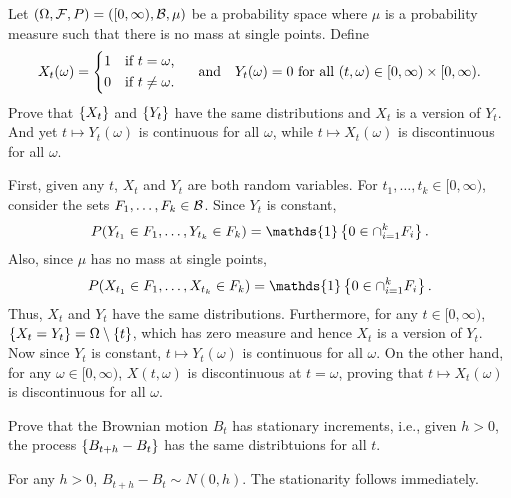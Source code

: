 \begin{exercise}{2.9}\label{ex:2.9}
    Let $(\Omega, \mathcal{F}, P) = ([0,\infty),\mathcal{B},\mu)$ be a probability space where 
    $\mu$ is a probability measure such that there is no mass at single points. 
    Define 
    \begin{equation*}
        X_t(\omega) = \begin{cases*}
            1 & if $t = \omega$, \\ 
            0 & if $t\neq \omega$.
        \end{cases*}\quad\text{and}\quad 
        Y_t(\omega) = 0\text{ for all } (t,\omega)\in[0,\infty)\times[0,\infty).
    \end{equation*} 
    Prove that $\left\{ {X_t} \right\}$ and $\left\{ {Y_t} \right\}$ have the same distributions and $X_t$ 
    is a version of $Y_t$. And yet $t\mapsto Y_t(\omega)$ is continuous for     all $\omega$, while $t\mapsto X_t(\omega)$ is discontinuous for all $\omega$. 
\end{exercise}
\begin{solution}
    First, given any $t$, $X_t$ and $Y_t$ are both random variables. For $t_1,\ldots,t_k\in[0,\infty)$, 
    consider the sets $F_1,\ldots,F_k\in\mathcal{B}$. Since $Y_t$ is constant, 
    \begin{equation*}
        P(Y_{t_1}\in F_1,\ldots,Y_{t_k}\in F_k) = \mathds{1}\set{0\in \cap_{i=1}^k F_i}.
    \end{equation*}
    Also, since $\mu$ has no mass at single points, 
    \begin{equation*}
        P(X_{t_1}\in F_1,\ldots,X_{t_k}\in F_k) = \mathds{1}\set{0\in \cap_{i=1}^k F_i}.
    \end{equation*}
    Thus, $X_t$ and $Y_t$ have the same distributions. Furthermore, for any 
    $t\in[0,\infty)$, $\left\{ {X_t = Y_t} \right\} = \Omega\setminus\left\{ {t} \right\}$, which has 
    zero measure and hence $X_t$ is a version of $Y_t$. Now since $Y_t$ is 
    constant, $t\mapsto Y_t(\omega)$ is continuous for all $\omega$. On the other 
    hand, for any $\omega\in[0,\infty)$, $X(t, \omega)$ is discontinuous at $t = \omega$, 
    proving that $t\mapsto X_t(\omega)$ is discontinuous for all $\omega$.
\end{solution}

\begin{exercise}{2.10}\label{ex:2.10}
    Prove that the Brownian motion $B_t$ has stationary increments, i.e., 
    given $h>0$, the process $\left\{ {B_{t+h}-B_t} \right\}$ has the same distribtuions 
    for all $t$. 
\end{exercise}
\begin{solution}
    For any $h>0$, $B_{t+h}-B_t\sim N(0, h)$. The stationarity follows immediately.
\end{solution}

